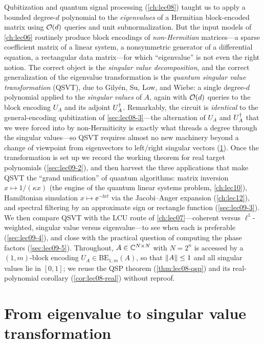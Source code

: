 Qubitization and quantum signal processing (\cref{ch:lec08}) taught us to apply a
bounded degree-$d$ polynomial to the \emph{eigenvalues} of a Hermitian block-encoded
matrix using $\mathcal{O}(d)$ queries and unit subnormalization. But the input models of
\cref{ch:lec06} routinely produce block encodings of \emph{non-Hermitian} matrices---a
sparse coefficient matrix of a linear system, a nonsymmetric generator of a
differential equation, a rectangular data matrix---for which ``eigenvalue'' is not
even the right notion. The correct object is the \emph{singular value decomposition},
and the correct generalization of the eigenvalue transformation is the
\emph{quantum singular value transformation} (QSVT), due to Gily\'en, Su, Low, and
Wiebe: a single degree-$d$ polynomial applied to the \emph{singular values} of $A$,
again with $\mathcal{O}(d)$ queries to the block encoding $U_A$ and its adjoint $U_A^{\dagger}$.
Remarkably, the circuit is \emph{identical} to the general-encoding qubitization of
\cref{sec:lec08-3}---the alternation of $U_A$ and $U_A^{\dagger}$ that we were forced into by
non-Hermiticity is exactly what threads a degree through the singular values---so QSVT
requires almost no new machinery beyond a change of viewpoint from eigenvectors to
left/right singular vectors (\cref{sec:lec09-1}). Once the transformation is set up we
record the working theorem for real target polynomials (\cref{sec:lec09-2}), and then
harvest the three applications that make QSVT the ``grand unification'' of quantum
algorithms: matrix inversion $x\mapsto1/(\kappa x)$ (the engine of the quantum linear
systems problem, \cref{ch:lec10}), Hamiltonian simulation $x\mapsto\ee^{-\ii xt}$ via
the Jacobi--Anger expansion (\cref{ch:lec12}), and spectral filtering by an
approximate sign or rectangle function (\cref{sec:lec09-3}). We then compare QSVT with
the LCU route of \cref{ch:lec07}---coherent versus $\ell^1$-weighted, singular value
versus eigenvalue---to see when each is preferable (\cref{sec:lec09-4}), and close with
the practical question of computing the phase factors (\cref{sec:lec09-5}). Throughout,
$A\in\mathbb{C}^{N\times N}$ with $N=2^n$ is accessed by a $(1,m)$-block encoding
$U_A\in\mathrm{BE}_{1,m}(A)$, so that $\left\lVert A \right\rVert\le1$ and all singular values lie in
$[0,1]$; we reuse the QSP theorem (\cref{thm:lec08-qsp}) and its real-polynomial
corollary (\cref{cor:lec08-real}) without reproof.

\section{From eigenvalue to singular value transformation}
\label{sec:lec09-1}

